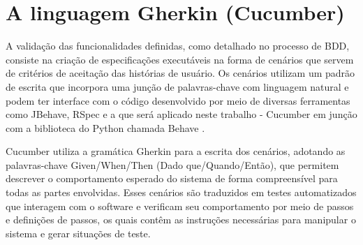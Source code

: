 






\section{A linguagem Gherkin (Cucumber)}
A validação das funcionalidades definidas, como detalhado no processo de BDD, consiste na criação de especificações executáveis na forma de cenários que servem de 
critérios de aceitação das histórias de usuário. Os cenários utilizam um padrão de escrita que incorpora uma junção de palavras-chave com linguagem natural e podem 
ter interface com o código desenvolvido por meio de diversas ferramentas como JBehave, RSpec \cite{cucumberHistory} e a que será aplicado neste trabalho - 
Cucumber \cite{cucumberDocs}  em junção com a biblioteca do Python chamada Behave \cite{behaveDocs}.

Cucumber utiliza a gramática Gherkin para a escrita dos cenários, adotando as palavras-chave Given/When/Then (Dado que/Quando/Então), que permitem descrever o 
comportamento esperado do sistema de forma compreensível para todas as partes envolvidas. Esses cenários são traduzidos em testes automatizados que interagem com 
o software e verificam seu comportamento por meio de passos e definições de passos, os quais contêm as instruções necessárias para manipular o sistema e gerar 
situações de teste.

